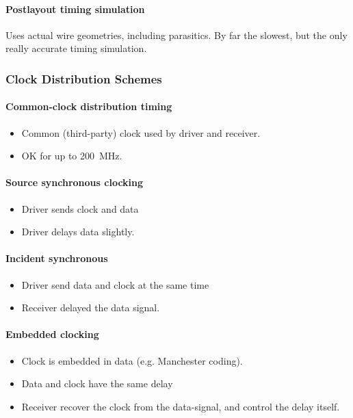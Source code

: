 \paragraph{Postlayout timing simulation}
Uses actual wire geometries, including parasitics.
By far the slowest, but the only really accurate timing simulation.

\subsubsection{Clock Distribution Schemes}

\paragraph{Common-clock distribution timing}
\begin{itemize}
	\item Common (third-party) clock used by driver and receiver.
	\item  OK for up to \SI{200}{\mega\hertz}.
\end{itemize} 

\paragraph{Source synchronous clocking}
\begin{itemize}
	\item Driver sends clock and data
	\item Driver delays data slightly.
\end{itemize}

\paragraph{Incident synchronous}
\begin{itemize}
	\item Driver send data and clock at the same time
	\item Receiver delayed the data signal.
\end{itemize}


\paragraph{Embedded clocking}
\begin{itemize}
	\item Clock is embedded in data (e.g. Manchester coding).
	\item Data and clock have the same delay
	\item Receiver recover the clock from the data-signal, and control the delay itself.
\end{itemize}

